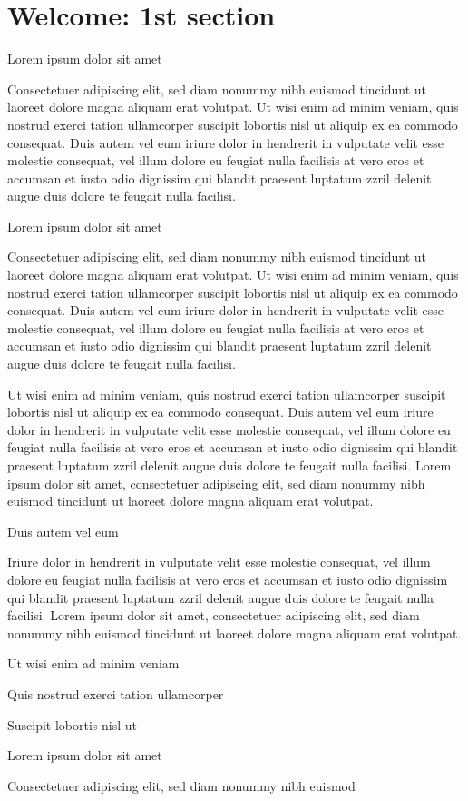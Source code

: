 \documentclass[11pt,twoside]{article}\makeatletter
\makeatletter
\renewcommand\section{\@startsection {section}{1}{\z@}%
     {-1.75ex \@plus -0.5ex \@minus -.2ex}%
     {0.5ex \@plus .2ex}%
     {\reset@font\Large\bfseries\sffamily}}
\def\DivI{\section}
\def\DivI{\chapter}
\makeatother
\begin{document}
\DivI[Welcome: 1st section]{Welcome: 1st section}\label{part1}\par Lorem ipsum dolor sit amet\par Consectetuer adipiscing elit, sed diam nonummy nibh euismod
      tincidunt ut laoreet dolore magna aliquam erat volutpat. Ut wisi enim
      ad minim veniam, quis nostrud exerci tation ullamcorper suscipit
      lobortis nisl ut aliquip ex ea commodo consequat. Duis autem vel eum
      iriure dolor in hendrerit in vulputate velit esse molestie consequat,
      vel illum dolore eu feugiat nulla facilisis at vero eros et accumsan
      et iusto odio dignissim qui blandit praesent luptatum zzril delenit
      augue duis dolore te feugait nulla facilisi.\par Lorem ipsum dolor sit amet\par Consectetuer adipiscing elit, sed diam nonummy nibh euismod
      tincidunt ut laoreet dolore magna aliquam erat volutpat. Ut wisi enim
      ad minim veniam, quis nostrud exerci tation ullamcorper suscipit
      lobortis nisl ut aliquip ex ea commodo consequat. Duis autem vel eum
      iriure dolor in hendrerit in vulputate velit esse molestie consequat,
      vel illum dolore eu feugiat nulla facilisis at vero eros et accumsan
      et iusto odio dignissim qui blandit praesent luptatum zzril delenit
      augue duis dolore te feugait nulla facilisi.\par Ut wisi enim ad minim veniam, quis nostrud exerci tation
      ullamcorper suscipit lobortis nisl ut aliquip ex ea commodo
      consequat. Duis autem vel eum iriure dolor in hendrerit in vulputate
      velit esse molestie consequat, vel illum dolore eu feugiat nulla
      facilisis at vero eros et accumsan et iusto odio dignissim qui blandit
      praesent luptatum zzril delenit augue duis dolore te feugait nulla
      facilisi. Lorem ipsum dolor sit amet, consectetuer adipiscing elit,
      sed diam nonummy nibh euismod tincidunt ut laoreet dolore magna
      aliquam erat volutpat. \par Duis autem vel eum \par Iriure dolor in hendrerit in vulputate velit esse molestie
      consequat, vel illum dolore eu feugiat nulla facilisis at vero eros et
      accumsan et iusto odio dignissim qui blandit praesent luptatum zzril
      delenit augue duis dolore te feugait nulla facilisi. Lorem ipsum dolor
      sit amet, consectetuer adipiscing elit, sed diam nonummy nibh euismod
      tincidunt ut laoreet dolore magna aliquam erat volutpat. \par Ut wisi enim ad minim veniam\par Quis nostrud exerci tation ullamcorper \par Suscipit lobortis nisl ut \par Lorem ipsum dolor sit amet\par Consectetuer adipiscing elit, sed diam nonummy nibh euismod
\end{document}
